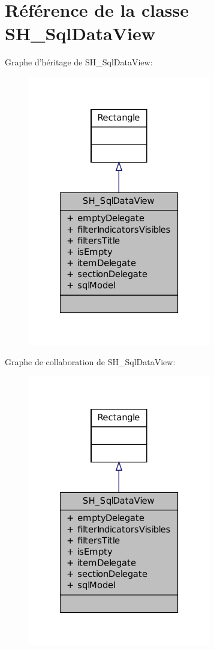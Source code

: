 \hypertarget{classSH__SqlDataView}{\section{Référence de la classe S\-H\-\_\-\-Sql\-Data\-View}
\label{classSH__SqlDataView}
}


Graphe d'héritage de S\-H\-\_\-\-Sql\-Data\-View\-:
\nopagebreak
\begin{figure}[H]
\begin{center}
\leavevmode
\includegraphics[width=226pt]{classSH__SqlDataView__inherit__graph}
\end{center}
\end{figure}


Graphe de collaboration de S\-H\-\_\-\-Sql\-Data\-View\-:
\nopagebreak
\begin{figure}[H]
\begin{center}
\leavevmode
\includegraphics[width=226pt]{classSH__SqlDataView__coll__graph}
\end{center}
\end{figure}
